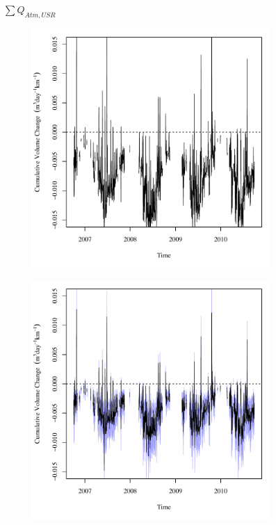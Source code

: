 \subfiguretop
\begin{landscape}
	\begin{figure}
		\centering
		$ \displaystyle \sum Q_{Atm,USR} $
		\begin{subfigure}{0.7\textwidth}
			\centering
			\includegraphics[width=\tableCustomSize]{"Figures/Results_USR/Deterministic/Balance Water - atm"}
		\end{subfigure}%
		\begin{subfigure}{0.7\textwidth}
			\centering
			\includegraphics[width=\tableCustomSize]{"Figures/Results_USR/Stochastic/Balance Water - atm"}

\end{subfigure}
\end{figure}
\end{landscape}

